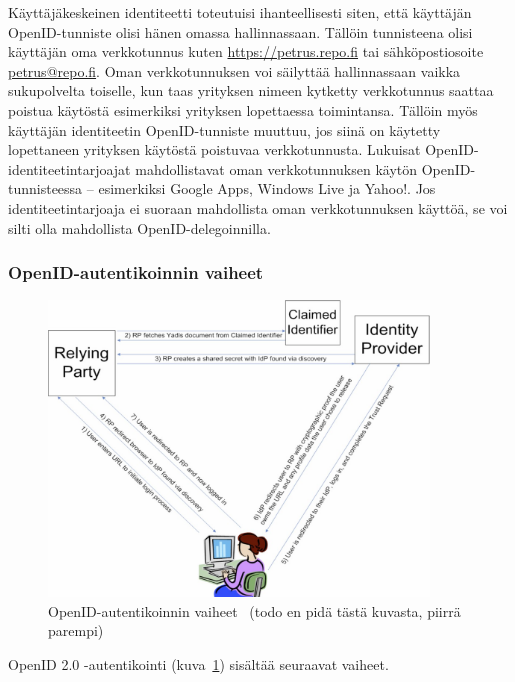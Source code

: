 \documentclass[finnish,gradu]{tktltiki}
\begin{document}
  Käyttäjäkeskeinen identiteetti toteutuisi ihanteellisesti siten, että käyttäjän OpenID-tunniste olisi hänen omassa hallinnassaan. Tällöin tunnisteena olisi käyttäjän oma verkkotunnus kuten \url{https://petrus.repo.fi} tai sähköpostiosoite \url{petrus@repo.fi}. Oman verkkotunnuksen voi säilyttää hallinnassaan vaikka sukupolvelta toiselle, kun taas yrityksen nimeen kytketty verkkotunnus saattaa poistua käytöstä esimerkiksi yrityksen lopettaessa toimintansa. Tällöin myös käyttäjän identiteetin OpenID-tunniste muuttuu, jos siinä on käytetty lopettaneen yrityksen käytöstä poistuvaa verkkotunnusta. Lukuisat OpenID-identiteetintarjoajat mahdollistavat oman verkkotunnuksen käytön OpenID-tunnisteessa -- esimerkiksi Google Apps, Windows Live ja Yahoo!. Jos identiteetintarjoaja ei suoraan mahdollista oman verkkotunnuksen käyttöä, se voi silti olla mahdollista OpenID-delegoinnilla.

  \subsubsection{OpenID-autentikoinnin vaiheet} %
  \label{ssub:openid_autentikoinnin_vaiheet}

  \begin{figure}
    \centering
    \includegraphics[width=0.9\textwidth]{images/openid_flow_recordon06.jpg}
    \caption{OpenID-autentikoinnin vaiheet~\cite{openid_recordon_2009} (todo en pidä tästä kuvasta, piirrä parempi)}
    \label{fig:basic_openid_flow}
  \end{figure}

  OpenID 2.0 -autentikointi (kuva~\ref{fig:basic_openid_flow}) sisältää seuraavat vaiheet.
\end{document}
